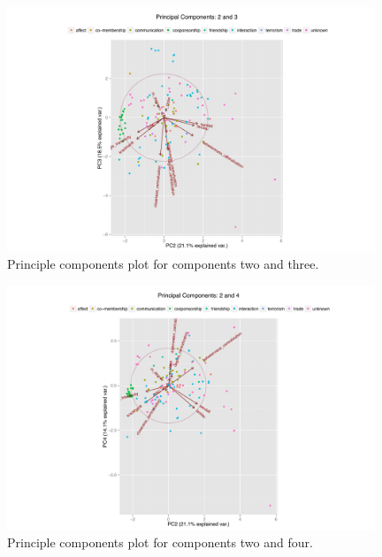 \documentclass[3p,times]{elsarticle}
\begin{document}
\begin{figure}
\begin{center}
	\caption{\label{fig:2 and 3} Principle components plot for components two and three.}
		\includegraphics[width = 0.98\textwidth]{./images/Observed_PCA_Components2_3.pdf}
\end{center}
\end{figure}

\begin{figure}
\begin{center}
	\caption{\label{fig:2 and 4} Principle components plot for components two and four.}
		\includegraphics[width = 0.98\textwidth]{./images/Observed_PCA_Components2_4.pdf}
\end{center}
\end{figure}
\end{document}
